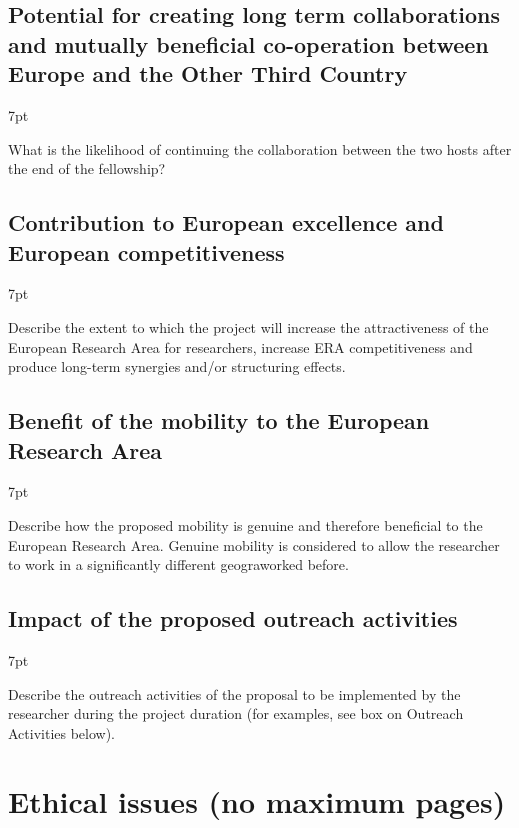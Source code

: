 \documentclass[11pt]{ltxdoc}
\newenvironment{formal}{%
  \def\FrameCommand{%
    \hspace{1pt}%
    {\color{darkblue}\vrule width 2pt}%
    {\color{formalshade}\vrule width 4pt}%
    \colorbox{formalshade}%
  }%
  \MakeFramed{\advance\hsize-\width\FrameRestore}%
  \noindent\hspace{-4.55pt}%
  \begin{adjustwidth}{}{7pt}%
  \vspace{2pt}\vspace{2pt}%
}
{%
  \vspace{2pt}\end{adjustwidth}\endMakeFramed%
}
\begin{document}
\subsection{Potential for creating long term collaborations and
  mutually beneficial co-operation between Europe and the Other Third
  Country}

\begin{formal}
  What is the likelihood of continuing the collaboration between the
  two hosts after the end of the fellowship?
\end{formal}

\subsection{Contribution to European excellence and European
  competitiveness}

\begin{formal}
  Describe the extent to which the project will increase the
  attractiveness of the European Research Area for researchers,
  increase ERA competitiveness and produce long-term synergies and/or
  structuring effects.
\end{formal}

\subsection{Benefit of the mobility to the European Research Area}

\begin{formal}
  Describe how the proposed mobility is genuine and therefore
  beneficial to the European Research Area. Genuine mobility is
  considered to allow the researcher to work in a significantly
  different geograworked before.
\end{formal}

\subsection{Impact of the proposed outreach activities}

\begin{formal}
  Describe the outreach activities of the proposal to be implemented
  by the researcher during the project duration (for examples, see box
  on Outreach Activities below).
\end{formal}

\section{Ethical issues  (no maximum pages)}
\end{document}
